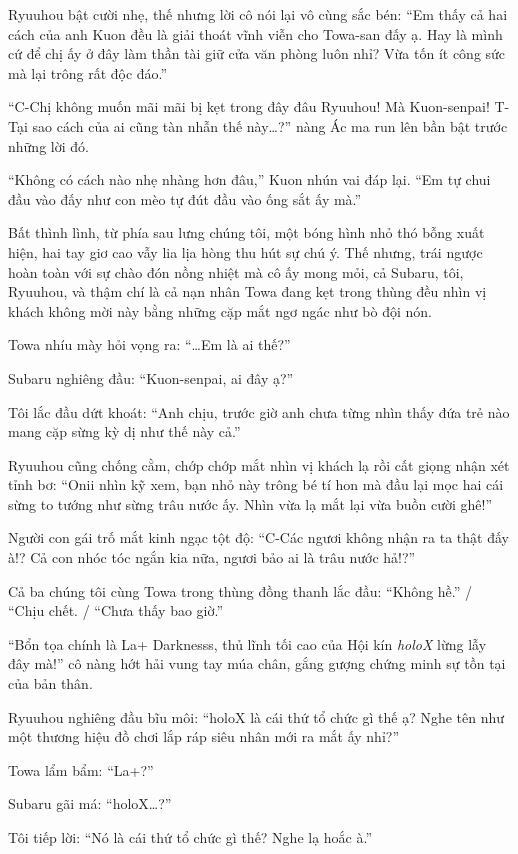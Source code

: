 \documentclass[../main.tex]{subfiles}
\begin{document}
Ryuuhou bật cười nhẹ, thế nhưng lời cô nói lại vô cùng sắc bén: ``Em thấy cả hai cách của anh Kuon đều là giải thoát vĩnh viễn cho Towa-san đấy ạ. Hay là mình cứ để chị ấy ở đây làm thần tài giữ cửa văn phòng luôn nhỉ? Vừa tốn ít công sức mà lại trông rất độc đáo.''

``C-Chị không muốn mãi mãi bị kẹt trong đây đâu Ryuuhou! Mà Kuon-senpai! T-Tại sao cách của ai cũng tàn nhẫn thế này\dots?'' nàng Ác ma run lên bần bật trước những lời đó.

``Không có cách nào nhẹ nhàng hơn đâu,'' Kuon nhún vai đáp lại. ``Em tự chui đầu vào đấy như con mèo tự đút đầu vào ống sắt ấy mà.''

Bất thình lình, từ phía sau lưng chúng tôi, một bóng hình nhỏ thó bỗng xuất hiện, hai tay giơ cao vẫy lia lịa hòng thu hút sự chú ý. Thế nhưng, trái ngược hoàn toàn với sự chào đón nồng nhiệt mà cô ấy mong mỏi, cả Subaru, tôi, Ryuuhou, và thậm chí là cả nạn nhân Towa đang kẹt trong thùng đều nhìn vị khách không mời này bằng những cặp mắt ngơ ngác như bò đội nón.

Towa nhíu mày hỏi vọng ra: ``\dots Em là ai thế?''

Subaru nghiêng đầu: ``Kuon-senpai, ai đây ạ?''

Tôi lắc đầu dứt khoát: ``Anh chịu, trước giờ anh chưa từng nhìn thấy đứa trẻ nào mang cặp sừng kỳ dị như thế này cả.''

Ryuuhou cũng chống cằm, chớp chớp mắt nhìn vị khách lạ rồi cất giọng nhận xét tỉnh bơ: ``Onii nhìn kỹ xem, bạn nhỏ này trông bé tí hon mà đầu lại mọc hai cái sừng to tướng như sừng trâu nước ấy. Nhìn vừa lạ mắt lại vừa buồn cười ghê!''

Người con gái trố mắt kinh ngạc tột độ: ``C-Các ngươi không nhận ra ta thật đấy à!? Cả con nhóc tóc ngắn kia nữa, ngươi bảo ai là trâu nước hả!?''

Cả ba chúng tôi cùng Towa trong thùng đồng thanh lắc đầu: ``Không hề.'' / ``Chịu chết. / ``Chưa thấy bao giờ.''

``Bổn tọa chính là La+ Darknesss, thủ lĩnh tối cao của Hội kín \textit{holoX} lừng lẫy đây mà!'' cô nàng hớt hải vung tay múa chân, gắng gượng chứng minh sự tồn tại của bản thân.

Ryuuhou nghiêng đầu bĩu môi: ``holoX là cái thứ tổ chức gì thế ạ? Nghe tên như một thương hiệu đồ chơi lắp ráp siêu nhân mới ra mắt ấy nhỉ?''

Towa lẩm bẩm: ``La+?''

Subaru gãi má: ``holoX\dots?''

Tôi tiếp lời: ``Nó là cái thứ tổ chức gì thế? Nghe lạ hoắc à.''
\end{document}
